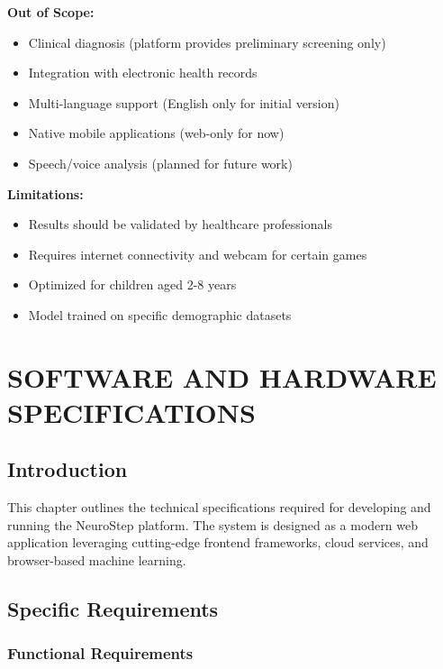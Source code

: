 \documentclass[12pt,letterpaper]{article}
\begin{document}
\textbf{Out of Scope:}
\begin{itemize}
    \item Clinical diagnosis (platform provides preliminary screening only)
    \item Integration with electronic health records
    \item Multi-language support (English only for initial version)
    \item Native mobile applications (web-only for now)
    \item Speech/voice analysis (planned for future work)
\end{itemize}

\textbf{Limitations:}
\begin{itemize}
    \item Results should be validated by healthcare professionals
    \item Requires internet connectivity and webcam for certain games
    \item Optimized for children aged 2-8 years
    \item Model trained on specific demographic datasets
\end{itemize}

\newpage


\section{SOFTWARE AND HARDWARE SPECIFICATIONS}

\subsection{Introduction}

This chapter outlines the technical specifications required for developing and running the NeuroStep platform. The system is designed as a modern web application leveraging cutting-edge frontend frameworks, cloud services, and browser-based machine learning.

\subsection{Specific Requirements}

\subsubsection{Functional Requirements}
\end{document}
